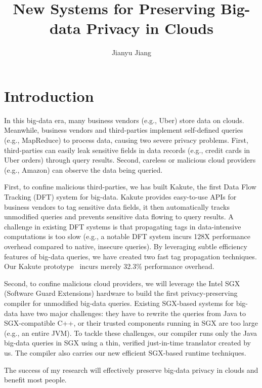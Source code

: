 \documentclass{article}
\title{New Systems for Preserving Big-data Privacy in Clouds}
\author{Jianyu Jiang}
\begin{document}
\maketitle

\section{Introduction}
In this big-data era, many business vendors (e.g., Uber) store data on clouds.
Meanwhile, business vendors and third-parties implement self-defined queries
(e.g., MapReduce) to process data, causing two severe privacy problems. First,
third-parties can easily leak sensitive fields in data records (e.g., credit
cards in Uber orders) through query results. Second, careless or malicious cloud
providers (e.g., Amazon) can observe the data being queried.

First, to confine malicious third-parties, we has built Kakute, the first Data
Flow Tracking (DFT) system for big-data. Kakute provides easy-to-use APIs for
business vendors to tag sensitive data fields, it then automatically tracks
unmodified queries and prevents sensitive data flowing to query results. A
challenge in existing DFT systems is that propagating tags in data-intensive
computations is too slow (e.g., a notable DFT system incurs 128X performance
overhead compared to native, insecure queries). By leveraging subtle efficiency
features of big-data queries, we have created two fast tag propagation
techniques. Our Kakute prototype~\cite{kakute:acsac17} incurs
merely 32.3\% performance overhead.

Second, to confine malicious cloud providers, we will leverage the Intel SGX
(Software Guard Extensions) hardware to build the first privacy-preserving
compiler for unmodified big-data queries. Existing SGX-based systems for
big-data have two major challenges: they have to rewrite the queries from Java
to SGX-compatible C++, or their trusted components running in SGX are too large
(e.g., an entire JVM). To tackle these challenges, our compiler runs only the
Java big-data queries in SGX using a thin, verified just-in-time translator
created by us. The compiler also carries our new efficient SGX-based runtime
techniques.

The success of my research will effectively preserve big-data privacy in
clouds and benefit most people.



\end{document}
